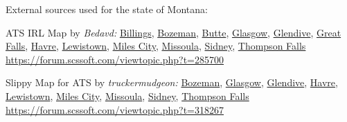 

















\vspace{2em}\footnoterule
{\footnotesize \noindent External sources used for the state of Montana:
\begin{description}[
	style=nextline,
	leftmargin=1.1em,
	labelsep=0pt,
	parsep=0pt,
	font=\normalfont,
]

\item[$\ast$]
ATS IRL Map by \textit{Bedavd:}
\hyperref[city:Billings]{Billings},
\hyperref[city:Bozeman]{Bozeman},
\hyperref[city:Butte]{Butte},
\hyperref[city:Glasgow]{Glasgow},
\hyperref[city:Glendive]{Glendive},
\hyperref[city:Great Falls]{Great Falls},
\hyperref[city:Havre]{Havre},
\hyperref[city:Lewistown]{Lewistown},
\hyperref[city:Miles City]{Miles City},
\hyperref[city:Missoula]{Missoula},
\hyperref[city:Sidney]{Sidney},
\hyperref[city:Thompson Falls]{Thompson Falls}
\\ \url{https://forum.scssoft.com/viewtopic.php?t=285700}

\item[$\dagger$]
Slippy Map for ATS by \textit{truckermudgeon:}
\hyperref[city:Bozeman]{Bozeman},
\hyperref[city:Glasgow]{Glasgow},
\hyperref[city:Glendive]{Glendive},
\hyperref[city:Havre]{Havre},
\hyperref[city:Lewistown]{Lewistown},
\hyperref[city:Miles City]{Miles City},
\hyperref[city:Missoula]{Missoula},
\hyperref[city:Sidney]{Sidney},
\hyperref[city:Thompson Falls]{Thompson Falls}
\\ \url{https://forum.scssoft.com/viewtopic.php?t=318267}

\end{description}
}
